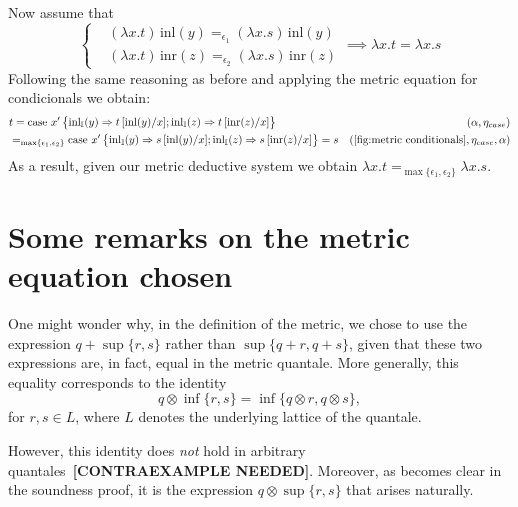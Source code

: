 Now assume that 
\[
\left\{
\begin{aligned}
&(\lambda x.t)\, \text{inl}(y) =_{\epsilon_1} (\lambda x.s)\, \text{inl}(y) \\
&(\lambda x.t)\, \text{inr}(z) =_{\epsilon_2}(\lambda x.s)\, \text{inr}(z)
\end{aligned}
\right.
\implies \lambda x.t = \lambda x.s
\]
Following the same reasoning as before and applying the metric equation for condicionals we obtain:
\begin{equation*}
\begin{split}
  &t =  \text{case } x'  
    \left\{ \begin{aligned}
    \inl_{\typeI}(y) \Rightarrow t\,[\text{inl}(y)/x] ;  
    \inl_{\typeI}(z) \Rightarrow t\,[\text{inr}(z)/x]
  \end{aligned}  \right\} & (\alpha,\eta_{case})\\
  &=_{\max \{\epsilon_1,\epsilon_2\}} \text{case } x'  
    \left\{ \begin{aligned}
    \inl_{\typeI}(y) \Rightarrow s\,[\text{inl}(y)/x] ;  
    \inl_{\typeI}(z) \Rightarrow s\,[\text{inr}(z)/x]
  \end{aligned}  \right\} = s & (\text{\autoref{fig:metric conditionals}},\eta_{case},\alpha)
\end{split}
\end{equation*}
As a result, given our metric deductive system we obtain $\lambda x.t =_{\max \{\epsilon_1,\epsilon_2\}} \lambda x.s$.



\section{Some remarks on the metric equation chosen}


One might wonder why, in the definition of the metric, we chose to use the expression \( q + \sup\{r, s\} \) rather than \( \sup\{q + r, q + s\} \), given that these two expressions are, in fact, equal in the metric quantale. More generally, this equality corresponds to the identity
\[
q \otimes \inf\{r, s\} = \inf\{q \otimes r, q \otimes s\},
\]
for \( r, s \in L \), where \( L \) denotes the underlying lattice of the quantale.

However, this identity does \emph{not} hold in arbitrary quantales~\textbf{[CONTRAEXAMPLE NEEDED]}. Moreover, as becomes clear in the soundness proof, it is the expression \( q \otimes \sup\{r, s\} \) that arises naturally. 